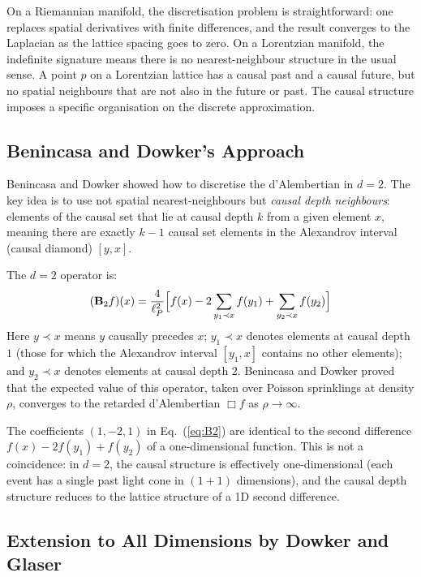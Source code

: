 \documentclass[12pt,a4paper]{article}
\begin{document}
On a Riemannian manifold, the discretisation problem is straightforward: one replaces spatial derivatives with finite differences, and the result converges to the Laplacian as the lattice spacing goes to zero.  On a Lorentzian manifold, the indefinite signature means there is no nearest-neighbour structure in the usual sense.  A point $p$ on a Lorentzian lattice has a causal past and a causal future, but no spatial neighbours that are not also in the future or past.  The causal structure imposes a specific organisation on the discrete approximation.

\subsection{Benincasa and Dowker's Approach}

Benincasa and Dowker \cite{Benincasa2010} showed how to discretise the d'Alembertian in $d=2$.  The key idea is to use not spatial nearest-neighbours but \emph{causal depth neighbours}: elements of the causal set that lie at causal depth $k$ from a given element $x$, meaning there are exactly $k-1$ causal set elements in the Alexandrov interval (causal diamond) $[y,x]$.

The $d=2$ operator is:
\begin{equation}
  (\mathbf{B}_2 f)(x) = \frac{4}{\ell_P^2}\Bigl[f(x) - 2\sum_{y_1\prec x}f(y_1) + \sum_{y_2\prec x}f(y_2)\Bigr]
  \label{eq:B2}
\end{equation}
Here $y\prec x$ means $y$ causally precedes $x$; $y_1\prec x$ denotes elements at causal depth $1$ (those for which the Alexandrov interval $[y_1,x]$ contains no other elements); and $y_2\prec x$ denotes elements at causal depth $2$.  Benincasa and Dowker proved that the expected value of this operator, taken over Poisson sprinklings at density $\rho$, converges to the retarded d'Alembertian $\Box f$ as $\rho\to\infty$.

The coefficients $(1,-2,1)$ in Eq.~(\ref{eq:B2}) are identical to the second difference $f(x)-2f(y_1)+f(y_2)$ of a one-dimensional function.  This is not a coincidence: in $d=2$, the causal structure is effectively one-dimensional (each event has a single past light cone in $(1+1)$ dimensions), and the causal depth structure reduces to the lattice structure of a 1D second difference.

\subsection{Extension to All Dimensions by Dowker and Glaser}
\end{document}
